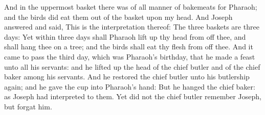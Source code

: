 \begin{biblechapter}
\verse And in the uppermost basket there was of all manner of bakemeats for Pharaoh; and the birds did eat them out of the basket upon my head.
\verse And Joseph answered and said, This is the interpretation thereof: The three baskets are three days:
\verse Yet within three days shall Pharaoh lift up thy head from off thee, and shall hang thee on a tree; and the birds shall eat thy flesh from off thee.
\verse And it came to pass the third day, which was Pharaoh's birthday, that he made a feast unto all his servants: and he lifted up the head of the chief butler and of the chief baker among his servants.
\verse And he restored the chief butler unto his butlership again; and he gave the cup into Pharaoh's hand:
\verse But he hanged the chief baker: as Joseph had interpreted to them.
\verse Yet did not the chief butler remember Joseph, but forgat him.
\end{biblechapter}

